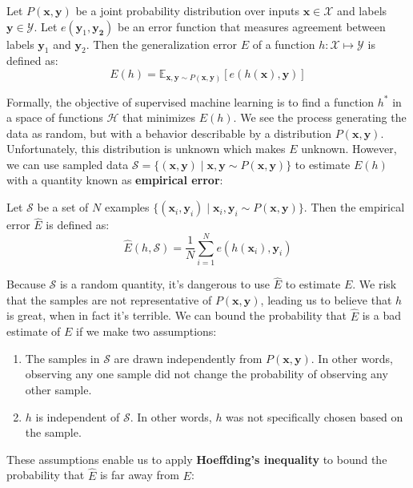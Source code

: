 \begin{definition} \label{generalisation_error}
	Let $P(\mathbf{x}, \mathbf{y})$ be a joint probability distribution over inputs $\mathbf{x} \in \mathcal{X}$ and labels $\mathbf{y} \in \mathcal{Y}$. Let $e(\mathbf{y}_1, \mathbf{y_2})$ be an error function that measures agreement between labels $\mathbf{y}_1$ and $\mathbf{y}_2$. Then the generalization error $E$ of a function $h: \mathcal{X} \mapsto \mathcal{Y}$ is defined as:
	$$
		E(h) = \mathbb{E}_{\mathbf{x},\mathbf{y}\sim P(\mathbf{x}, \mathbf{y})}[e(h(\mathbf{x}), \mathbf{y})]
	$$
\end{definition}
\noindent
Formally, the objective of supervised machine learning is to find a function $h^*$ in a space of functions $\mathcal{H}$ that minimizes $E(h)$. We see the process generating the data as random, but with a behavior describable by a distribution $P(\mathbf{x}, \mathbf{y})$. Unfortunately, this distribution is unknown which makes $E$ unknown. However, we can use sampled data $\mathcal{S} = \{(\mathbf{x}, \mathbf{y}) \mid \mathbf{x}, \mathbf{y} \sim P(\mathbf{x}, \mathbf{y})\}$ to estimate $E(h)$ with a quantity known as \textbf{empirical error}:

\begin{definition} \label{empirical_error}
	Let $\mathcal{S}$ be a set of $N$ examples $\{(\mathbf{x}_i, \mathbf{y}_i) \mid \mathbf{x}_i, \mathbf{y}_i \sim P(\mathbf{x}, \mathbf{y})\}$. Then the empirical error $\hat{E}$ is defined as:
	$$
		\hat{E}(h, \mathcal{S}) = \frac{1}{N}\sum\limits_{i=1}^N e(h(\mathbf{x}_i), \mathbf{y}_i)
	$$
\end{definition}

Because $\mathcal{S}$ is a random quantity, it's dangerous to use $\hat{E}$ to estimate $E$. We risk that the samples are not representative of $P(\mathbf{x}, \mathbf{y})$, leading us to believe that $h$ is great, when in fact it's terrible. We can bound the probability that $\hat{E}$ is a bad estimate of $E$ if we make two assumptions:
\begin{enumerate}
	\item The samples in $\mathcal{S}$ are drawn independently from $P(\mathbf{x}, \mathbf{y})$. In other words, observing any one sample did not change the probability of observing any other sample.
	\item $h$ is independent of $\mathcal{S}$. In other words, $h$ was not specifically chosen based on the sample.
\end{enumerate}
\noindent
These assumptions enable us to apply \textbf{Hoeffding's inequality} to bound the probability that $\hat{E}$ is far away from $E$:

